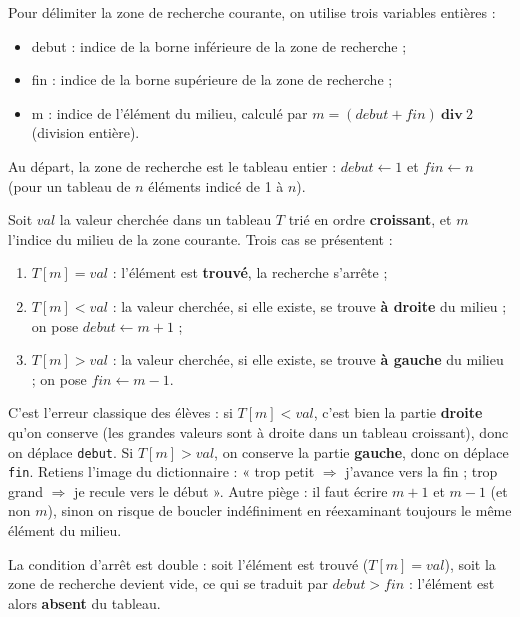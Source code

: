 \documentclass[11pt]{article}
\newcommand{\cle}[1]{{\popxbold\color{popdark}#1}}
\begin{document}
Pour délimiter la zone de recherche courante, on utilise trois variables entières :

\begin{itemize}
  \item \cle{debut} : indice de la borne inférieure de la zone de recherche ;
  \item \cle{fin} : indice de la borne supérieure de la zone de recherche ;
  \item \cle{m} : indice de l'élément du milieu, calculé par $m = (debut + fin)\ \textbf{div}\ 2$ (division entière).
\end{itemize}

Au départ, la zone de recherche est le tableau entier : $debut \leftarrow 1$ et $fin \leftarrow n$ (pour un tableau de $n$ éléments indicé de 1 à $n$).

\begin{propriete}
Soit $val$ la valeur cherchée dans un tableau $T$ trié en ordre \textbf{croissant}, et $m$ l'indice du milieu de la zone courante. Trois cas se présentent :
\begin{enumerate}
  \item $T[m] = val$ : l'élément est \textbf{trouvé}, la recherche s'arrête ;
  \item $T[m] < val$ : la valeur cherchée, si elle existe, se trouve \textbf{à droite} du milieu ; on pose $debut \leftarrow m + 1$ ;
  \item $T[m] > val$ : la valeur cherchée, si elle existe, se trouve \textbf{à gauche} du milieu ; on pose $fin \leftarrow m - 1$.
\end{enumerate}
\end{propriete}

\begin{attention}
C'est l'erreur classique des élèves : si $T[m] < val$, c'est bien la partie \textbf{droite} qu'on conserve (les grandes valeurs sont à droite dans un tableau croissant), donc on déplace \texttt{debut}. Si $T[m] > val$, on conserve la partie \textbf{gauche}, donc on déplace \texttt{fin}. Retiens l'image du dictionnaire : « trop petit $\Rightarrow$ j'avance vers la fin ; trop grand $\Rightarrow$ je recule vers le début ». Autre piège : il faut écrire $m + 1$ et $m - 1$ (et non $m$), sinon on risque de boucler indéfiniment en réexaminant toujours le même élément du milieu.
\end{attention}

La \cle{condition d'arrêt} est double : soit l'élément est trouvé ($T[m] = val$), soit la zone de recherche devient vide, ce qui se traduit par $debut > fin$ : l'élément est alors \textbf{absent} du tableau.
\end{document}

